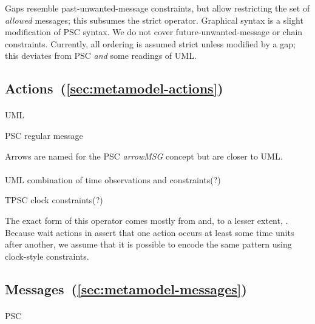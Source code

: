 Gaps resemble past-unwanted-message constraints, but
allow restricting the set of \emph{allowed} messages;
this subsumes the strict operator.  Graphical syntax is a slight
modification of PSC syntax.  We do not cover
future-unwanted-message or chain constraints.  Currently, all
ordering is assumed strict unless modified by a gap; this
deviates from PSC \emph{and} some readings of UML.
    
\subsection{Actions~(\ref{sec:metamodel-actions})}

\paragraph{\marrowaction}
\begin{featset}
\item[UML] 
\item[PSC] regular message
\end{featset}

Arrows are named for the PSC \emph{arrowMSG} concept but are closer
to UML.
      
\paragraph{\mwaitaction}
\begin{featset}
\item[UML] combination of time observations and constraints(?)
\item[TPSC] clock constraints(?)
\end{featset}

The exact form of this operator comes mostly from \robochart{} and, to
a lesser extent, \tockcsp.
Because wait actions in \langname{} assert that one
action occurs at least some time units after another, we assume that it is
possible to encode the same pattern using clock-style constraints.

\subsection{Messages~(\ref{sec:metamodel-messages})}

\paragraph{\mmessageset}
\begin{featset}
\item[PSC] 
\end{featset}

